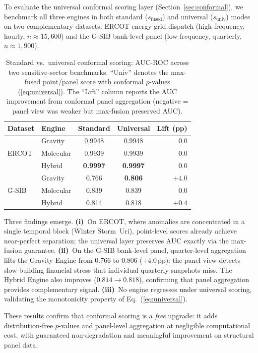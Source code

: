 \documentclass[final]{siamltex}
\begin{document}
To evaluate the universal conformal scoring layer
(Section~\ref{sec:conformal}), we benchmark all three engines
in both standard ($s_{\mathrm{fused}}$) and universal
($s_{\mathrm{univ}}$) modes on two complementary datasets:
ERCOT energy-grid dispatch (high-frequency, hourly, $n \approx
15{,}600$) and the G-SIB bank-level panel (low-frequency,
quarterly, $n \approx 1{,}900$).

\begin{table}[htbp]
\centering
\caption{Standard vs.\ universal conformal scoring: AUC-ROC
across two sensitive-sector benchmarks.  ``Univ'' denotes the
max-fused point/panel score with conformal $p$-values
(\ref{eq:universal}).  The ``Lift'' column reports the AUC
improvement from conformal panel aggregation (negative = panel
view was weaker but max-fusion preserved AUC).}
\label{tab:conformal}
\begin{tabular}{@{}llccr@{}}
\toprule
Dataset & Engine & Standard & Universal & Lift (pp)\\
\midrule
\multirow{3}{*}{ERCOT}
& Gravity   & 0.9948 & 0.9948 & $0.0$ \\
& Molecular & 0.9939 & 0.9939 & $0.0$ \\
& Hybrid    & \textbf{0.9997} & \textbf{0.9997} & $0.0$ \\
\midrule
\multirow{3}{*}{G-SIB}
& Gravity   & 0.766  & \textbf{0.806}  & $+4.0$ \\
& Molecular & 0.839  & 0.839  & $0.0$ \\
& Hybrid    & 0.814  & 0.818  & $+0.4$ \\
\bottomrule
\end{tabular}
\end{table}

Three findings emerge.  \textbf{(i)}~On ERCOT, where anomalies
are concentrated in a single temporal block (Winter Storm~Uri),
point-level scores already achieve near-perfect separation;
the universal layer preserves AUC exactly via the max-fusion
guarantee.  \textbf{(ii)}~On the G-SIB bank-level panel,
quarter-level aggregation lifts the Gravity Engine from $0.766$
to $0.806$ ($+4.0$\,pp): the panel view detects slow-building
financial stress that individual quarterly snapshots miss.
The Hybrid Engine also improves ($0.814 \to 0.818$), confirming
that panel aggregation provides complementary signal.
\textbf{(iii)}~No engine regresses under universal scoring,
validating the monotonicity property of Eq.~(\ref{eq:universal}).

These results confirm that conformal scoring is a \emph{free}
upgrade: it adds distribution-free $p$-values and panel-level
aggregation at negligible computational cost, with guaranteed
non-degradation and meaningful improvement on structural panel
data.
\end{document}
